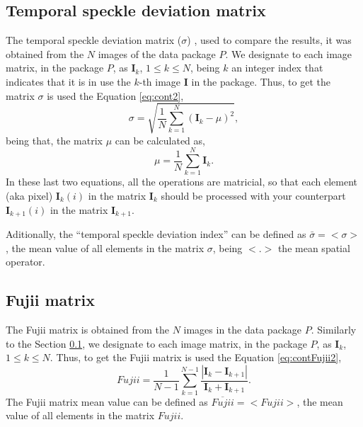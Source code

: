 \documentclass[review]{elsarticle}
\begin{document}
\subsection{Temporal speckle deviation matrix}
\label{subsec:deviation}
The temporal speckle deviation matrix ($\sigma$) \cite{Nothdurft:05},
used to compare the results, it was obtained from the $N$ images of the data package $P$.
We designate to each image matrix, in the package $P$, as $\mathbf{I}_{k}$, $1\leq k \leq N$, 
being $k$ an integer index that indicates that it is in use the $k$-th image $\mathbf{I}$ in the package.
Thus, to get
the matrix $\sigma$ is used the Equation \ref{eq:cont2}, 
\begin{equation}\label{eq:cont2}
\sigma  = \sqrt{ \frac{1}{N} \sum_{k=1}^{N} (\mathbf{I}_{k}-\mu)^2  },
\end{equation}
being that, the matrix $\mu$ can be calculated as, 
\begin{equation}\label{eq:cont1}
\mu =  \frac{1}{N} \sum_{k=1}^{N} \mathbf{I}_{k}.
\end{equation}
In these last two equations, all the operations are matricial, 
so that each element (aka pixel) $\mathbf{I}_{k}(i)$ in the matrix $\mathbf{I}_{k}$
should be processed with your  counterpart $\mathbf{I}_{k+1}(i)$ in the matrix $\mathbf{I}_{k+1}$.


Aditionally, the ``temporal speckle deviation index'' can be defined as $\bar{\sigma}=<\sigma>$, the mean value
of all elements in the matrix $\sigma$, being $<.>$ the mean spatial operator.


\subsection{Fujii matrix}
\label{subsec:fujii}

The Fujii matrix \cite{Fujii:87} is obtained from the $N$ images in the data package $P$.
Similarly to the Section \ref{subsec:deviation}, 
we designate to each image matrix, in the package $P$, as $\mathbf{I}_{k}$, $1\leq k \leq N$.
Thus, to get the Fujii matrix is used the Equation \ref{eq:contFujii2}, 
\begin{equation}\label{eq:contFujii2}
Fujii  = \frac{1}{N-1} \sum_{k=1}^{N-1} \frac{|\mathbf{I}_{k}-\mathbf{I}_{k+1}|}{\mathbf{I}_{k}+\mathbf{I}_{k+1}}.
\end{equation} 
The  Fujii matrix mean value can be defined as $\overline{Fujii}=<Fujii>$, the mean value
of all elements in the matrix $Fujii$.
\end{document}
